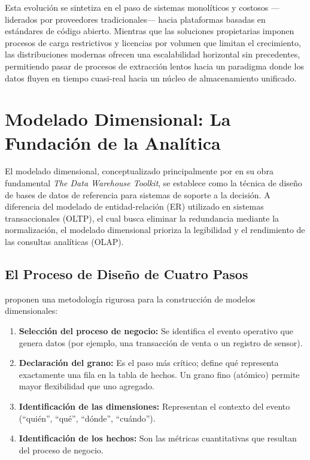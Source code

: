Esta evolución se sintetiza en el paso de sistemas monolíticos y costosos ---liderados por proveedores tradicionales--- hacia plataformas basadas en estándares de código abierto. Mientras que las soluciones propietarias imponen procesos de carga restrictivos y licencias por volumen que limitan el crecimiento, las distribuciones modernas ofrecen una escalabilidad horizontal sin precedentes, permitiendo pasar de procesos de extracción lentos hacia un paradigma donde los datos fluyen en tiempo cuasi-real hacia un núcleo de almacenamiento unificado.


\section{Modelado Dimensional: La Fundación de la Analítica}

El modelado dimensional, conceptualizado principalmente por \textcite{kimball2013data} en su obra fundamental \textit{The Data Warehouse Toolkit}, se establece como la técnica de diseño de bases de datos de referencia para sistemas de soporte a la decisión. A diferencia del modelado de entidad-relación (ER) utilizado en sistemas transaccionales (OLTP), el cual busca eliminar la redundancia mediante la normalización, el modelado dimensional prioriza la legibilidad y el rendimiento de las consultas analíticas (OLAP).

\subsection{El Proceso de Diseño de Cuatro Pasos}

\textcite{kimball2013data} proponen una metodología rigurosa para la construcción de modelos dimensionales:

\begin{enumerate}
    \item \textbf{Selección del proceso de negocio:} Se identifica el evento operativo que genera datos (por ejemplo, una transacción de venta o un registro de sensor).
    \item \textbf{Declaración del grano:} Es el paso más crítico; define qué representa exactamente una fila en la tabla de hechos. Un grano fino (atómico) permite mayor flexibilidad que uno agregado.
    \item \textbf{Identificación de las dimensiones:} Representan el contexto del evento (``quién'', ``qué'', ``dónde'', ``cuándo'').
    \item \textbf{Identificación de los hechos:} Son las métricas cuantitativas que resultan del proceso de negocio.
\end{enumerate}
